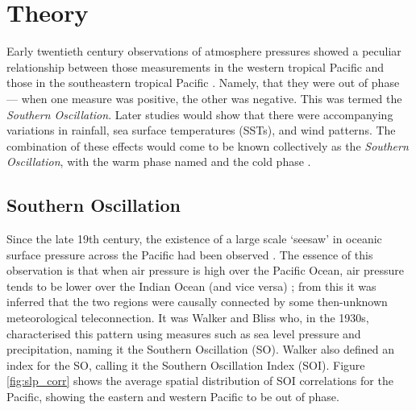 \section{Theory}
\label{sec:theory}

Early twentieth century observations of atmosphere pressures showed a peculiar
relationship between those measurements in the western tropical Pacific and
those in the southeastern tropical Pacific \citep{holton1989}. Namely, that they
were out of phase --- when one measure was positive, the other was negative.  This
was termed the \emph{Southern Oscillation}. Later studies \cite{bjerknes1969}
would show that there were accompanying variations in rainfall, sea surface
temperatures (SSTs), and wind patterns. The combination of these effects would come to
be known collectively as the \elnino{} \emph{Southern Oscillation}, with the
warm phase named \elnino{} and the cold phase \nina{}.


\subsection{Southern Oscillation}
Since the late 19th century, the existence of a large scale `seesaw' in oceanic
surface pressure across the Pacific had been observed \citep{trenberth2000}. The
essence of this observation is that when air pressure is high over the Pacific
Ocean, air pressure tends to be lower over the Indian Ocean (and vice versa)
\citep{philander1990}; from this it was inferred that the two regions were
causally connected by some then-unknown meteorological teleconnection. It was
Walker and Bliss who, in the 1930s, characterised this pattern using measures
such as sea level pressure and precipitation, naming it the Southern Oscillation
(SO). Walker also defined an index for the SO, calling it the Southern
Oscillation Index (SOI). Figure \ref{fig:slp_corr} shows the average spatial
distribution of SOI correlations for the Pacific, showing the eastern and
western Pacific to be out of phase.

